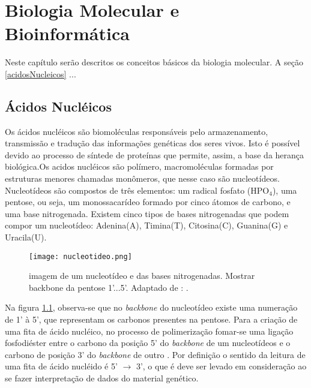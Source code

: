\chapter{Biologia Molecular e Bioinformática}
 
\indent Neste capítulo serão descritos os conceitos básicos da biologia molecular. A seção \ref{acidosNucleicos} ...







\section{Ácidos Nucléicos} \label{aceidosNucleicos}

\indent Os ácidos nucléicos são biomoléculas responsáveis pelo armazenamento, transmissão e tradução das informações genéticas dos seres vivos. Isto é possível devido ao processo de síntede de proteínas que permite, assim, a base da herança biológica.Os acidos nucléicos são polímero, macromoléculas formadas por estruturas menores chamadas monômeros, que nesse caso são nucleotídeos. Nucleotídeos são compostos de três elementos: um radical fosfato (HPO$_{4}$), uma pentose, ou seja, um monossacarídeo formado por cinco átomos de carbono, e uma base nitrogenada. Existem cinco tipos de bases nitrogenadas que podem compor um nucleotídeo: Adenina(A), Timina(T), Citosina(C), Guanina(G) e Uracila(U).

\begin{figure}[h]
    \centering
    \texttt{[image: nucleotideo.png]}
    \caption{imagem de um nucleotídeo e das bases nitrogenadas. Mostrar backbone da pentose 1'...5'. Adaptado de : \cite{dnadiscovery08}. }
    \label{fig:Nucleotideo}
\end{figure} 

\indent Na figura \ref{fig:Nucleotideo}, observa-se que no \textit{backbone} do nucleotídeo existe uma numeração de 1' à 5', que representam os carbonos presentes na pentose. Para a criação de uma fita de ácido nucléico, no processo de polimerização fomar-se uma ligação fosfodiéster entre o carbono da posição 5' do \textit{backbone} de um nucleotídeos e o carbono de posição 3' do \textit{backbone} de outro \cite{setubal97}. Por definição o sentido da leitura de uma fita de ácido nucléido é 5' $\rightarrow$ 3', o que é deve ser levado em consideração ao se fazer interpretação de dados do material genético.

